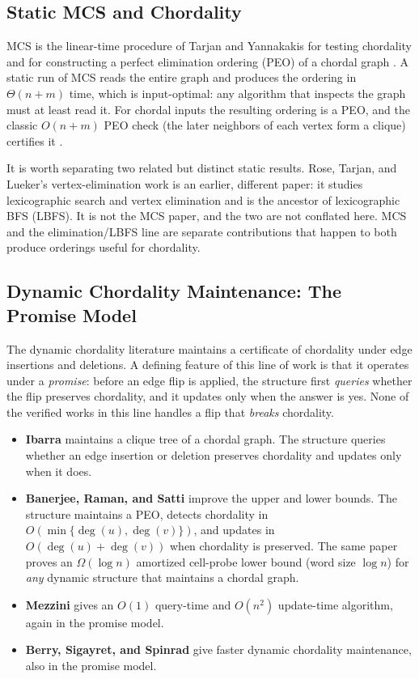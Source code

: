 \documentclass[12pt,a4paper]{article}
\begin{document}
\subsection{Static MCS and Chordality}

MCS is the linear-time procedure of Tarjan and Yannakakis for testing chordality and for constructing a perfect elimination ordering (PEO) of a chordal graph \cite{tarjan1984mcs}. A static run of MCS reads the entire graph and produces the ordering in $\Theta(n+m)$ time, which is input-optimal: any algorithm that inspects the graph must at least read it. For chordal inputs the resulting ordering is a PEO, and the classic $O(n+m)$ PEO check (the later neighbors of each vertex form a clique) certifies it \cite{tarjan1984mcs,heggernes2006}.

It is worth separating two related but distinct static results. Rose, Tarjan, and Lueker's vertex-elimination work \cite{rose1976algorithmic} is an earlier, different paper: it studies lexicographic search and vertex elimination and is the ancestor of lexicographic BFS (LBFS). It is not the MCS paper, and the two are not conflated here. MCS \cite{tarjan1984mcs} and the elimination/LBFS line \cite{rose1976algorithmic} are separate contributions that happen to both produce orderings useful for chordality.

\subsection{Dynamic Chordality Maintenance: The Promise Model}

The dynamic chordality literature maintains a certificate of chordality under edge insertions and deletions. A defining feature of this line of work is that it operates under a \emph{promise}: before an edge flip is applied, the structure first \emph{queries} whether the flip preserves chordality, and it updates only when the answer is yes. None of the verified works in this line handles a flip that \emph{breaks} chordality.

\begin{itemize}[noitemsep]
  \item \textbf{Ibarra} \cite{ibarra2008dynamic} maintains a clique tree of a chordal graph. The structure queries whether an edge insertion or deletion preserves chordality and updates only when it does.
  \item \textbf{Banerjee, Raman, and Satti} \cite{banerjee2018maintaining} improve the upper and lower bounds. The structure maintains a PEO, detects chordality in $O(\min\{\deg(u),\deg(v)\})$, and updates in $O(\deg(u)+\deg(v))$ when chordality is preserved. The same paper proves an $\Omega(\log n)$ amortized cell-probe lower bound (word size $\log n$) for \emph{any} dynamic structure that maintains a chordal graph.
  \item \textbf{Mezzini} \cite{mezzini2012fully} gives an $O(1)$ query-time and $O(n^2)$ update-time algorithm, again in the promise model.
  \item \textbf{Berry, Sigayret, and Spinrad} \cite{berry2005faster} give faster dynamic chordality maintenance, also in the promise model.
\end{itemize}
\end{document}
